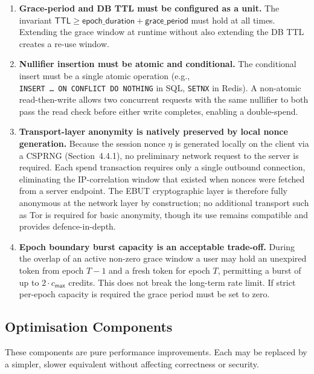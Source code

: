 \documentclass[11pt]{article}
\theoremstyle{definitionstyle}
\theoremstyle{plain}
\begin{document}
\begin{enumerate}[leftmargin=*,label=\textbf{M\arabic*.}]
\item \textbf{Grace-period and DB TTL must be configured as a unit.}
  The invariant $\mathsf{TTL} \ge \mathsf{epoch\_duration} +
  \mathsf{grace\_period}$ must hold at all times.  Extending the grace window
  at runtime without also extending the DB TTL creates a re-use window.

\item \textbf{Nullifier insertion must be atomic and conditional.}
  The conditional insert must be a single atomic operation (e.g.,
  \texttt{INSERT~\ldots~ON~CONFLICT~DO~NOTHING} in SQL, \texttt{SETNX} in
  Redis).  A non-atomic read-then-write allows two concurrent requests with
  the same nullifier to both pass the read check before either write
  completes, enabling a double-spend.

\item \textbf{Transport-layer anonymity is natively preserved by local nonce generation.}
  Because the session nonce $\eta$ is generated locally on the client via a CSPRNG (Section~4.4.1), no preliminary network request to the server is required.  Each spend transaction requires only a single outbound connection, eliminating the IP-correlation window that existed when nonces were fetched from a server endpoint.  The EBUT cryptographic layer is therefore fully anonymous at the network layer by construction; no additional transport such as Tor is required for basic anonymity, though its use remains compatible and provides defence-in-depth.

\item \textbf{Epoch boundary burst capacity is an acceptable trade-off.}
  During the overlap of an active non-zero grace window a user may hold an unexpired
  token from epoch $T-1$ and a fresh token for epoch $T$, permitting a
  burst of up to $2 \cdot c_{\mathsf{max}}$ credits.  This does not break
  the long-term rate limit.  If strict per-epoch capacity is required the
  grace period must be set to zero.

\end{enumerate}

\subsection{Optimisation Components}
\label{sec:optimisations}

These components are pure performance improvements.  Each may be replaced by
a simpler, slower equivalent without affecting correctness or security.
\end{document}
